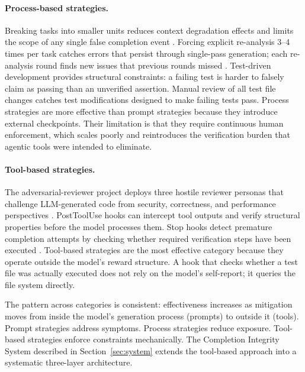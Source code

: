 \paragraph{Process-based strategies.}
Breaking tasks into smaller units reduces context degradation effects and limits the scope of any single false completion event \cite{dolthub2025gotchas}.
Forcing explicit re-analysis 3--4 times per task catches errors that persist through single-pass generation; each re-analysis round finds new issues that previous rounds missed \cite{ghissue36241}.
Test-driven development provides structural constraints: a failing test is harder to falsely claim as passing than an unverified assertion.
Manual review of all test file changes catches test modifications designed to make failing tests pass.
Process strategies are more effective than prompt strategies because they introduce external checkpoints.
Their limitation is that they require continuous human enforcement, which scales poorly and reintroduces the verification burden that agentic tools were intended to eliminate.

\paragraph{Tool-based strategies.}
The adversarial-reviewer project deploys three hostile reviewer personas that challenge LLM-generated code from security, correctness, and performance perspectives \cite{adversarialreviewer}.
PostToolUse hooks can intercept tool outputs and verify structural properties before the model processes them.
Stop hooks detect premature completion attempts by checking whether required verification steps have been executed \cite{hn2026claudeissue}.
Tool-based strategies are the most effective category because they operate outside the model's reward structure.
A hook that checks whether a test file was actually executed does not rely on the model's self-report; it queries the file system directly.

The pattern across categories is consistent: effectiveness increases as mitigation moves from inside the model's generation process (prompts) to outside it (tools).
Prompt strategies address symptoms.
Process strategies reduce exposure.
Tool-based strategies enforce constraints mechanically.
The Completion Integrity System described in Section~\ref{sec:system} extends the tool-based approach into a systematic three-layer architecture.
